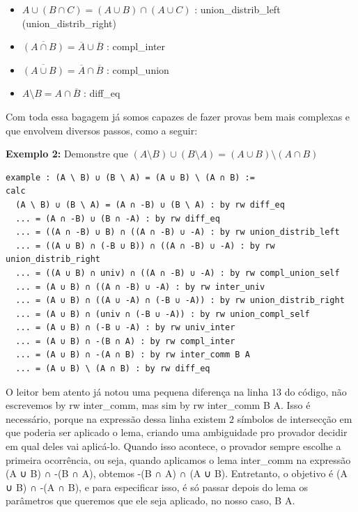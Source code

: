\begin{itemize}
\item $A \cup (B \cap C) = (A \cup B) \cap (A \cup C)$ : {\selectfont union\_distrib\_left} ({\selectfont union\_distrib\_right})
\item $\overline{(A \cap B)} = \overline A \cup \overline B$ : {\selectfont compl\_inter}
\item $\overline{(A \cup B)} = \overline A \cap \overline B$ : {\selectfont compl\_union}
\item $A \setminus B = A \cap \overline B$ : {\selectfont diff\_eq}
\end{itemize}

Com toda essa bagagem já somos capazes de fazer provas bem mais complexas e que envolvem diversos passos, como a seguir:

\textbf{Exemplo 2:} Demonstre que $(A \setminus B) \cup (B \setminus A) = (A \cup B) \setminus (A \cap B)$
\begin{lstlisting}
example : (A \ B) ∪ (B \ A) = (A ∪ B) \ (A ∩ B) :=
calc
  (A \ B) ∪ (B \ A) = (A ∩ -B) ∪ (B \ A) : by rw diff_eq
  ... = (A ∩ -B) ∪ (B ∩ -A) : by rw diff_eq
  ... = ((A ∩ -B) ∪ B) ∩ ((A ∩ -B) ∪ -A) : by rw union_distrib_left
  ... = ((A ∪ B) ∩ (-B ∪ B)) ∩ ((A ∩ -B) ∪ -A) : by rw union_distrib_right
  ... = ((A ∪ B) ∩ univ) ∩ ((A ∩ -B) ∪ -A) : by rw compl_union_self
  ... = (A ∪ B) ∩ ((A ∩ -B) ∪ -A) : by rw inter_univ
  ... = (A ∪ B) ∩ ((A ∪ -A) ∩ (-B ∪ -A)) : by rw union_distrib_right
  ... = (A ∪ B) ∩ (univ ∩ (-B ∪ -A)) : by rw union_compl_self
  ... = (A ∪ B) ∩ (-B ∪ -A) : by rw univ_inter
  ... = (A ∪ B) ∩ -(B ∩ A) : by rw compl_inter
  ... = (A ∪ B) ∩ -(A ∩ B) : by rw inter_comm B A
  ... = (A ∪ B) \ (A ∩ B) : by rw diff_eq \end{lstlisting}

O leitor bem atento já notou uma pequena diferença na linha $13$ do código, não escrevemos {\selectfont by rw inter\_comm}, mas sim {\selectfont by rw inter\_comm B A}. Isso é necessário, porque na expressão dessa linha existem $2$ símbolos de intersecção em que poderia ser aplicado o lema, criando uma ambiguidade pro provador decidir em qual deles vai aplicá-lo. Quando isso acontece, o provador sempre escolhe a primeira ocorrência, ou seja, quando aplicamos o lema {\selectfont inter\_comm} na expressão {\selectfont (A ∪ B) ∩ -(B ∩ A)}, obtemos {\selectfont -(B ∩ A) ∩ (A ∪ B)}. Entretanto, o objetivo é {\selectfont (A ∪ B) ∩ -(A ∩ B)}, e para especificar isso, é só passar depois do lema os parâmetros que queremos que ele seja aplicado, no nosso caso, {\selectfont B A}.

